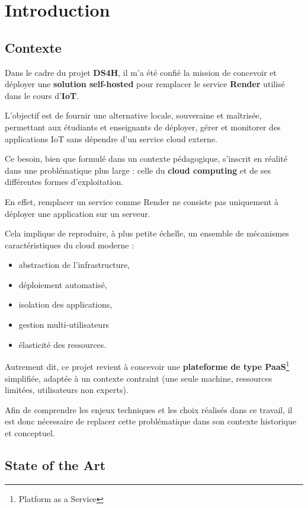 \documentclass{rapportClass} %
\begin{document}
\newpage
\chapter{Introduction}
\section{Contexte}  
Dans le cadre du projet \textbf{DS4H}, il m'a été confié la mission de
concevoir et déployer une \textbf{solution self-hosted} pour remplacer
le service \textbf{Render} utilisé dans le cours d’\textbf{IoT}.


L’objectif est de fournir une alternative locale, souveraine et
maîtrisée, permettant aux étudiants et enseignants de déployer, gérer
et monitorer des applications IoT sans dépendre d’un service cloud
externe.

Ce besoin, bien que formulé dans un contexte pédagogique, s’inscrit en
réalité dans une problématique plus large : celle du \textbf{cloud
computing} et de ses différentes formes d’exploitation.

En effet, remplacer un service comme Render ne consiste pas uniquement
à déployer une application sur un serveur.

Cela implique de reproduire, à plus petite échelle, un ensemble de
mécanismes caractéristiques du cloud moderne :
\begin{itemize}
\item abstraction de l’infrastructure,
\item déploiement automatisé, 
\item isolation des applications,
\item gestion multi-utilisateurs 
\item élasticité des ressources.
\end{itemize}

Autrement dit, ce projet revient à concevoir une \textbf{plateforme de
  type PaaS}\footnote{Platform as a Service} simplifiée, adaptée à un
contexte contraint (une seule machine, ressources limitées,
utilisateurs non experts).

Afin de comprendre les enjeux techniques et les choix réalisés dans ce
travail, il est donc nécessaire de replacer cette problématique dans
son contexte historique et conceptuel.

\section{State of the Art}
\end{document}
